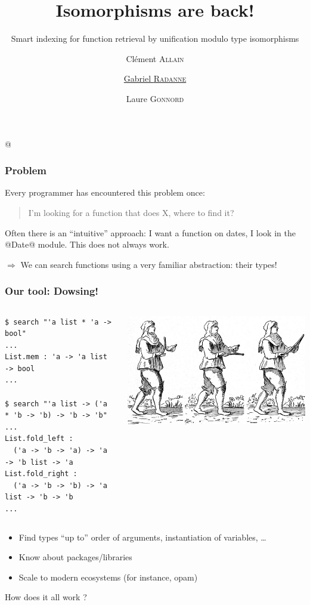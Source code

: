 \documentclass[aspectratio=169,dvipsnames,svgnames,10pt]{beamer}
\title{Isomorphisms are back!}
\subtitle{Smart indexing for function retrieval by unification modulo type isomorphisms}
\author{
  Clément \textsc{Allain}
  \and
  \underline{Gabriel \textsc{Radanne}}
  \and
  Laure \textsc{Gonnord} \\
}
\date{}
\begin{document}
\lstMakeShortInline[keepspaces,basicstyle=\small\ttfamily]@

\begin{frame}
  \titlepage
\end{frame}

\begin{frame}[fragile]
  \frametitle{Problem}

  Every programmer has encountered this problem once:

  \begin{quotation}
    I'm looking for a function that does X, where to find it?
  \end{quotation}

  Often there is an ``intuitive'' approach: I want a function
  on dates, I look in the @Date@ module. This does not always work.

  \pause
  $\Rightarrow$ We can search functions using a very familiar abstraction: their types!
  
\end{frame}

\begin{frame}[fragile]
  \frametitle{Our tool: Dowsing!}
  \begin{columns}
    \footnotesize
\begin{verbatim}
$ search "'a list * 'a -> bool"
...
List.mem : 'a -> 'a list -> bool
...

$ search "'a list -> ('a * 'b -> 'b) -> 'b -> 'b"
...
List.fold_left :
  ('a -> 'b -> 'a) -> 'a -> 'b list -> 'a
List.fold_right :
  ('a -> 'b -> 'b) -> 'a list -> 'b -> 'b
...
\end{verbatim}
    \includegraphics{sourcier}
  \end{columns}

  \vfill
  
\begin{itemize}
\item Find types ``up to'' order of arguments, instantiation of variables, \dots
\item Know about packages/libraries
\item Scale to modern ecosystems (for instance, opam)
\end{itemize}
\pause
How does it all work ?
\end{frame}
\end{document}
